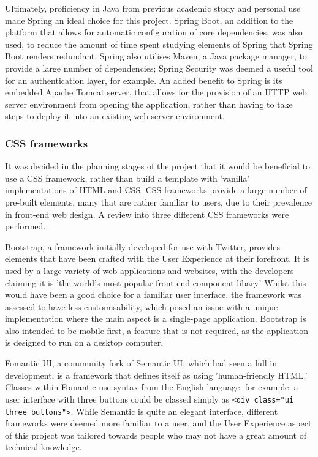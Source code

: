 Ultimately, proficiency in Java from previous academic study and personal use made Spring an ideal choice for this project. Spring Boot, an addition to the platform that allows for automatic configuration of core dependencies, was also used, to reduce the amount of time spent studying elements of Spring that Spring Boot renders redundant. Spring also utilises Maven, a Java package manager, to provide a large number of dependencies; Spring Security was deemed a useful tool for an authentication layer, for example. An added benefit to Spring is its embedded Apache Tomcat server, that allows for the provision of an HTTP web server environment from opening the application, rather than having to take steps to deploy it into an existing web server environment.

\subsubsection{CSS frameworks}

It was decided in the planning stages of the project that it would be beneficial to use a CSS framework, rather than build a template with 'vanilla' implementations of HTML and CSS. CSS frameworks provide a large number of pre-built elements, many that are rather familiar to users, due to their prevalence in front-end web design. A review into three different CSS frameworks were performed.

Bootstrap, a framework initially developed for use with Twitter, provides elements that have been crafted with the User Experience at their forefront. It is used by a large variety of web applications and websites, with the developers claiming it is 'the world's most popular front-end component libary.' Whilst this would have been a good choice for a familiar user interface, the framework was assessed to have less customisability, which posed an issue with a unique implementation where the main aspect is a single-page application. Bootstrap is also intended to be mobile-first, a feature that is not required, as the application is designed to run on a desktop computer\cite{CochranDavid2012TBwd}.

Fomantic UI, a community fork of Semantic UI, which had seen a lull in development, is a framework that defines itself as using 'human-friendly HTML.' Classes within Fomantic use syntax from the English language, for example, a user interface with three buttons could be classed simply as \texttt{<div class="ui three buttons">}. While Semantic is quite an elegant interface, different frameworks were deemed more familiar to a user, and the User Experience aspect of this project was tailored towards people who may not have a great amount of technical knowledge\cite{Fomantic}.

